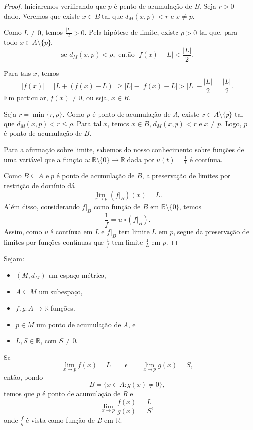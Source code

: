 \begin{proof}
    Iniciaremos verificando que $p$ é ponto de acumulação de $B$.
    Seja $r>0$ dado.
    Veremos que existe $x\in B$ tal que $d_M(x,p)<r$ e $x\neq p$.

    Como $L\neq 0$, temos $\frac{|L|}{2}>0$.
    Pela hipótese de limite, existe $\rho>0$ tal que, para todo $x\in A\setminus\{p\}$,
    \[
        \text{se }d_M(x,p)<\rho,\text{ então } |f(x)-L|<\frac{|L|}{2}.
    \]

    Para tais $x$, temos
    \[
        |f(x)|
        =
        |L+(f(x)-L)|
        \geq
        |L|-|f(x)-L|
        >
        |L|-\frac{|L|}{2}
        =
        \frac{|L|}{2}.
    \]
    Em particular, $f(x)\neq 0$, ou seja, $x\in B$.
    
    Seja $\bar r=\min\{r,\rho\}$.
    Como $p$ é ponto de acumulação de $A$, existe $x\in A\setminus\{p\}$ tal que $d_M(x,p)<\bar r\leq\rho$.
    Para tal $x$, temos $x\in B$, $d_M(x,p)<r$ e $x\neq p$.
    Logo, $p$ é ponto de acumulação de $B$.
    \medskip

    Para a afirmação sobre limite, sabemos do nosso conhecimento sobre funções de uma variável que a função $u:\mathbb R\setminus\{0\}\to\mathbb R$ dada por $u(t)=\frac{1}{t}$ é contínua.

    Como $B\subseteq A$ e $p$ é ponto de acumulação de $B$, a preservação de limites por restrição de domínio dá
    \[
        \lim_{x\to p}(f|_B)(x)=L.
    \]
    Além disso, considerando $f|_B$ como função de $B$ em $\mathbb R\setminus\{0\}$, temos
    \[
        \frac{1}{f}=u\circ (f|_B).
    \]
    Assim, como $u$ é contínua em $L$ e $f|_B$ tem limite $L$ em $p$, segue da preservação de limites por funções contínuas que $\frac{1}{f}$ tem limite $\frac{1}{L}$ em $p$.
\end{proof}

\begin{corollary}
    Sejam:
    \begin{itemize}
        \item $(M,d_M)$ um espaço métrico,
        \item $A\subseteq M$ um subespaço,
        \item $f,g:A\to\mathbb R$ funções,
        \item $p\in M$ um ponto de acumulação de $A$, e
        \item $L,S\in\mathbb R$, com $S\neq 0$.
    \end{itemize}

    Se
    \[
        \lim_{x\to p}f(x)=L
        \qquad\text{e}\qquad
        \lim_{x\to p}g(x)=S,
    \]
    então, pondo
    \[
        B=\{x\in A:g(x)\neq 0\},
    \]
    temos que $p$ é ponto de acumulação de $B$ e
    \[
        \lim_{x\to p}\frac{f(x)}{g(x)}=\frac{L}{S},
    \]
    onde $\frac{f}{g}$ é vista como função de $B$ em $\mathbb R$.
\end{corollary}

